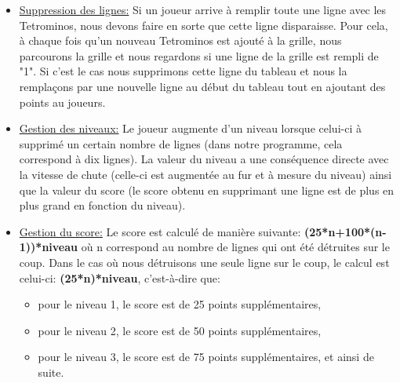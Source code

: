 \documentclass[a4paper, 11pt]{article}
\begin{document}
\begin{itemize}
\begin{itemize}
            		\item \underline{Suppression des lignes:} %
            		Si un joueur arrive à remplir toute une ligne avec les Tetrominos, nous devons faire en sorte que cette ligne disparaisse. Pour cela, à chaque fois qu'un nouveau Tetrominos est ajouté à la grille, nous parcourons la grille et nous regardons si une ligne de la grille est rempli de "1". Si c'est le cas nous supprimons cette ligne du tableau et nous la remplaçons par une nouvelle ligne au début du tableau tout en ajoutant des points au joueurs.
            		\newline
            		
            		\item \underline{Gestion des niveaux:} %
            		Le joueur augmente d'un niveau lorsque celui-ci à supprimé un certain nombre de lignes (dans notre programme, cela correspond à dix lignes). La valeur du niveau a une conséquence directe avec la vitesse de chute (celle-ci est augmentée au fur et à mesure du niveau) ainsi que la valeur du score (le score obtenu en supprimant une ligne est de plus en plus grand en fonction du niveau).
            		
            		\item \underline {Gestion du score:} %
            		Le score est calculé de manière suivante: \textbf{(25*n+100*(n-1))*niveau}
            		où n correspond au nombre de lignes qui ont été détruites sur le coup.
            		\newline
            		Dans le cas où nous détruisons une seule ligne sur le coup, le calcul est celui-ci: \textbf{(25*n)*niveau}, c'est-à-dire que:
            		\begin{itemize}
            		    \item pour le niveau 1, le score est de 25 points supplémentaires,
            		    \item pour le niveau 2, le score est de 50 points supplémentaires,
            		    \item pour le niveau 3, le score est de 75 points supplémentaires, et ainsi de suite.
            		 \end{itemize}
            		 

\end{itemize}
\end{itemize}
\end{document}
